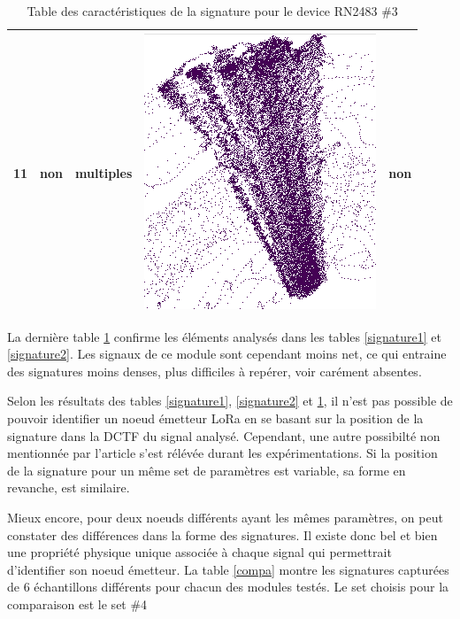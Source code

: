 \begin{table}[h]
\begin{tabular}{|c|c|c|c|c|}
\hline
11 & non & multiples & \includegraphics[scale=0.2]{images/set33.png}  & non \\
\hline
\end{tabular}
\caption{Table des caractéristiques de la signature pour le device RN2483 \#3}
\label{signature3}
\end{table}

La dernière table \ref{signature3} confirme les éléments analysés dans les tables \ref{signature1} et \ref{signature2}. Les signaux de ce module sont cependant moins net, ce qui entraine des signatures moins denses, plus difficiles à repérer, voir carément absentes.

\vspace{0.1cm}

Selon les résultats des tables \ref{signature1}, \ref{signature2} et \ref{signature3}, il n'est pas possible de pouvoir identifier un noeud émetteur \ac{LoRa} en se basant sur la position de la signature dans la \ac{DCTF} du signal analysé. Cependant, une autre possibilté non mentionnée par l'article s'est rélévée durant les expérimentations. Si la position de la signature pour un même set de paramètres est variable, sa forme en revanche, est similaire. 

Mieux encore, pour deux noeuds différents ayant les mêmes paramètres, on peut constater des différences dans la forme des signatures. Il existe donc bel et bien une propriété physique unique associée à chaque signal qui permettrait d'identifier son noeud émetteur. La table \ref{compa} montre les signatures capturées de 6 échantillons différents pour chacun des modules testés. Le set choisis pour la comparaison est le set \#4

